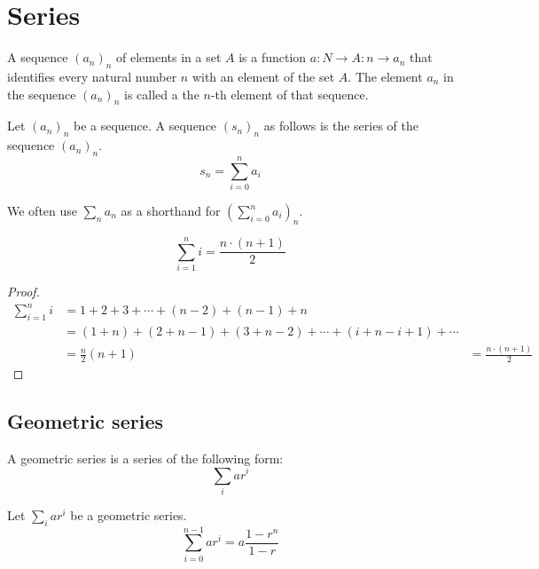 \documentclass[main.tex]{subfiles}
\begin{document}
\chapter{Series}

\begin{de}
  A sequence $(a_{n})_{n}$ of elements in a set $A$ is a function $a: N
  \rightarrow A: n \rightarrow a_{n}$ that identifies every natural number $n$ with an element of
  the set $A$. The element $a_{n}$ in the sequence $(a_{n})_{n}$ is called a the
  $n$-th element of that sequence.
\end{de}

\begin{de}
  Let $(a_{n})_{n}$ be a sequence.
  A sequence $(s_{n})_{n}$ as follows is the series of the sequence $(a_{n})_{n}$.
  \[ s_{n} = \sum_{i=0}^{n}a_{i} \]
\end{de}

\begin{de}
  We often use $\sum_{n}a_n$ as a shorthand for $\left(\sum_{i=0}^{n}a_{i}\right)_{n}$.
\end{de}

\begin{pr}
  \label{pr:sum-of-first-n-natural-numbers}
  \[
    \sum_{i=1}^n i = \frac{n\cdot(n+1)}{2}
  \]
  \begin{proof}
    \begin{align*}
      \sum_{i=1}^n i
      &= 1 + 2 + 3 + \dotsb + (n-2) + (n-1) + n\\
      &= (1 + n) + (2+n-1) + (3+n-2) + \dotsb + (i+n-i+1) + \dotsb\\
      &= \frac{n}{2} (n+1)
      &= \frac{n\cdot(n+1)}{2}
    \end{align*}
  \end{proof}
\end{pr}


\section{Geometric series}

\begin{de}
  A geometric series is a series of the following form:
  \[ \sum_{i}ar^{i} \]
\end{de}

\begin{pr}
  \label{pr:closed-form-expression-nth-term-of-geometric-series}
  Let $\sum_{i}ar^{i}$ be a geometric series.
  \[ \sum_{i=0}^{n-1}ar^{i} = a\frac{1 - r^{n}}{1 - r} \]
\end{pr}
\end{document}
